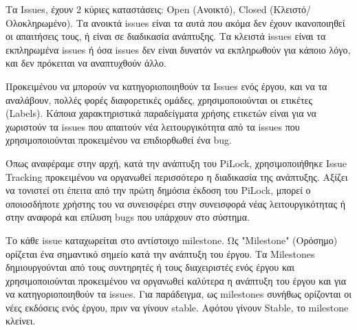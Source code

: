	Τα Issues, έχουν 2 κύριες καταστάσεις: Open (Ανοικτό), Closed (Κλειστό/Ολοκληρωμένο). Τα ανοικτά issues είναι τα αυτά που ακόμα δεν έχουν ικανοποιηθεί οι απαιτήσεις τους, ή είναι σε διαδικασία ανάπτυξης. Τα κλειστά issues είναι τα εκπληρωμένα issues ή όσα issues δεν είναι δυνατόν να εκπληρωθούν για κάποιο λόγο, και δεν πρόκειται να αναπτυχθούν άλλο.

	Προκειμένου να μπορούν να κατηγοριοποιηθούν τα Issues ενός έργου, και να τα αναλάβουν, πολλές φορές διαφορετικές ομάδες, χρησιμοποιούνται οι ετικέτες (Labels). Κάποια χαρακτηριστικά παραδείγματα χρήσης ετικετών είναι για να χωριστούν τα issues που απαιτούν νέα λειτουργικότητα από τα issues που χρησιμοποιούνται προκειμένου να επιδιορθωθεί ένα bug.

	Όπως αναφέραμε στην αρχή, κατά την ανάπτυξη του PiLock, χρησιμοποιήθηκε Issue Tracking προκειμένου να οργανωθεί περισσότερο η διαδικασία της ανάπτυξης. Αξίζει να τονιστεί οτι έπειτα από την πρώτη δημόσια έκδοση του PiLock, μπορεί ο οποιοσδήποτε χρήστης του να συνεισφέρει στην συνεισφορά νέας λειτουργικότητας ή στην αναφορά και επίλυση bugs που υπάρχουν στο σύστημα.

	Το κάθε issue καταχωρείται στο αντίστοιχο milestone. Ως "Milestone" (Ορόσημο) ορίζεται ένα σημαντικό σημείο κατά την ανάπτυξη του έργου. Τα Milestones δημιουργούνται από τους συντηρητές ή τους διαχειριστές ενός έργου και χρησιμοποιούνται προκειμένου να οργανωθεί καλύτερα η ανάπτυξη του έργου και για να κατηγοριοποιηθούν τα issues. Για παράδειγμα, ως milestones συνήθως ορίζονται οι νέες εκδόσεις ενός έργου, πριν να γίνουν stable. Αφότου γίνουν Stable, το milestone κλείνει. 